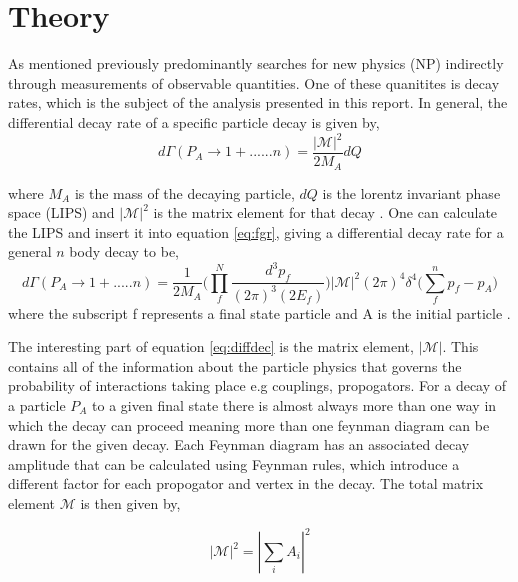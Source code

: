 
\section{Theory}
\label{sec:Theory}


As mentioned previously \lhcb predominantly searches for new physics (NP) indirectly through measurements of observable quantities.  One of these quanitites is decay rates, which is the subject of the analysis presented in this report.  In general, the differential decay rate of a specific particle decay is given by,
\begin{equation}
  \label{eq:fgr}
  d\Gamma(P_A\to1 + ......n) = \frac{|\mathscr{M}|^2}{2M_A}dQ
\end{equation}

where $M_A$ is the mass of the decaying particle, $dQ$ is the lorentz invariant phase space (LIPS) and $|\mathscr{M}|^2$ is the matrix element for that decay \cite{halzen1984quarks}.  One can calculate the LIPS and insert it into equation \ref{eq:fgr}, giving a differential decay rate for a general $n$ body decay to be,
\begin{equation}
  \label{eq:diffdec}
  d\Gamma(P_A \to 1+ .....n) = \frac{1}{2M_A}\bigg(\prod_{f}^{N}\frac{d^3p_f}{(2\pi)^3(2E_f)}\bigg)|\mathscr{M}|^2(2\pi)^4\delta^4\bigg(\sum_{f}^np_f-p_A\bigg)
\end{equation}
where the subscript f represents a final state particle and A is the initial particle \cite{halzen1984quarks}.

The interesting part of equation {\ref{eq:diffdec}} is the matrix element, $|\mathscr{M}|$.  This contains all of the information about the particle physics that governs the probability of interactions taking place e.g couplings, propogators. For a decay of a particle $P_A$ to a given final state there is almost always more than one way in which the decay can proceed meaning more than one feynman diagram can be drawn for the given decay.  Each Feynman diagram has an associated decay amplitude that can be calculated using Feynman rules, which introduce a different factor for each propogator and vertex in the decay.  The total matrix element $\mathscr{M}$ is then given by,

\begin{equation}
  \label{eq:matrix}
  |\mathscr{M}|^2=|\sum_i A_i|^2
\end{equation}

